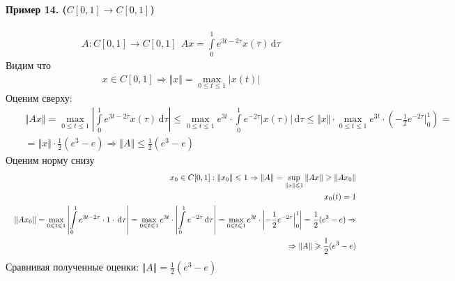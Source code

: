 \documentclass{article}[12pt]
\renewcommand{\d}{\,\mathrm{d}}
\begin{document}
\paragraph{Пример 14. ($C[0,1]\to C[0,1]$)}
\begin{eqnarray*}
    A:C[0,1]\to C[0,1]
    \ \ Ax=\int\limits_{0}^{1}e^{3t-2\tau}x(\tau)\d\tau
\end{eqnarray*}
Видим что
\begin{eqnarray*}
    x\in C[0,1] \Rightarrow \Vert x \Vert
    =\max_{0\leqslant t\leqslant 1}|x(t)|
\end{eqnarray*}
Оценим сверху:
\begin{eqnarray*}
&&\Vert Ax \Vert
=\max_{0\leqslant t\leqslant 1}
\left|\int\limits_{0}^{1}e^{3t-2\tau}x(\tau)\d\tau\right|
\leqslant \max_{0\leqslant t\leqslant 1}e^{3t}
\cdot\int\limits_{0}^{1}e^{-2\tau}|x(\tau)|\d\tau
\leqslant \Vert x \Vert \cdot\max_{0\leqslant t\leqslant 1}
e^{3t}\cdot\left(-\frac{1}{2}e^{-2\tau}\Big|^{1}_{0}\right)=\\
&&=\Vert x \Vert \cdot\frac{1}{2}(e^{3}-e)
\Rightarrow \Vert A \Vert \leqslant \frac{1}{2}(e^{3}-e)
\end{eqnarray*}
Оценим норму снизу
\begin{eqnarray*}
    \displaystyle
    &&x_{0}\in C[0,1]:\Vert x_{0} \Vert \leqslant 1
    \Rightarrow \Vert A \Vert = \sup_{\Vert x \Vert \leqslant 1}\Vert Ax \Vert
    \geqslant \Vert Ax_{0} \Vert\\
    &&x_{0}(t)=1\\
    &&\Vert Ax_{0} \Vert =\max_{0\leqslant t\leqslant 1}
    \left|\int\limits_{0}^{1}e^{3t-2\tau}\cdot 1\cdot \d\tau\right|
    =\max_{0\leqslant t\leqslant 1}e^{3t}\cdot
    \left|\int\limits_{0}^{1}e^{-2\tau}\d\tau\right|
    =\max_{0\leqslant t\leqslant 1}e^{3t}\cdot
    \left|-\frac{1}{2}e^{-2\tau}\Big|^{1}_{0}\right|
    =\frac{1}{2}(e^{3}-e)\Rightarrow \\
    && \Rightarrow \Vert A \Vert \geqslant \frac{1}{2}(e^{3}-e)
\end{eqnarray*}
Сравнивая полученные оценки: $\Vert A \Vert =\frac{1}{2}(e^{3}-e)$
\end{document}
